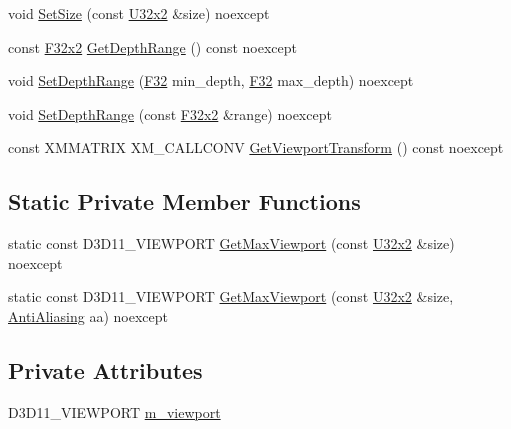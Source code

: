 \begin{DoxyCompactItemize}
\item 
void \mbox{\hyperlink{classmage_1_1rendering_1_1_viewport_a8b5578069d4e4afa99ca4a0b89541025}{Set\+Size}} (const \mbox{\hyperlink{namespacemage_a31f2bb52b5080e706e1c13de07c0a249}{U32x2}} \&size) noexcept
\item 
const \mbox{\hyperlink{namespacemage_a9dc0d34d6ecc87e4cfa4a826102117bc}{F32x2}} \mbox{\hyperlink{classmage_1_1rendering_1_1_viewport_a50cb4c020709eddb8addb4420a59e1d0}{Get\+Depth\+Range}} () const noexcept
\item 
void \mbox{\hyperlink{classmage_1_1rendering_1_1_viewport_a2dc258c833d225567bba28129c061c2d}{Set\+Depth\+Range}} (\mbox{\hyperlink{namespacemage_aa97e833b45f06d60a0a9c4fc22ae02c0}{F32}} min\+\_\+depth, \mbox{\hyperlink{namespacemage_aa97e833b45f06d60a0a9c4fc22ae02c0}{F32}} max\+\_\+depth) noexcept
\item 
void \mbox{\hyperlink{classmage_1_1rendering_1_1_viewport_a99c76e086ab0db6e9311ab4985d760d6}{Set\+Depth\+Range}} (const \mbox{\hyperlink{namespacemage_a9dc0d34d6ecc87e4cfa4a826102117bc}{F32x2}} \&range) noexcept
\item 
const X\+M\+M\+A\+T\+R\+IX X\+M\+\_\+\+C\+A\+L\+L\+C\+O\+NV \mbox{\hyperlink{classmage_1_1rendering_1_1_viewport_ac4ea113f2c019b5b1d369898537ab5c3}{Get\+Viewport\+Transform}} () const noexcept
\end{DoxyCompactItemize}
\subsection*{Static Private Member Functions}
\begin{DoxyCompactItemize}
\item 
static const D3\+D11\+\_\+\+V\+I\+E\+W\+P\+O\+RT \mbox{\hyperlink{classmage_1_1rendering_1_1_viewport_a9a931b51974ac4cd2d93aac2c0e10a09}{Get\+Max\+Viewport}} (const \mbox{\hyperlink{namespacemage_a31f2bb52b5080e706e1c13de07c0a249}{U32x2}} \&size) noexcept
\item 
static const D3\+D11\+\_\+\+V\+I\+E\+W\+P\+O\+RT \mbox{\hyperlink{classmage_1_1rendering_1_1_viewport_ac971d4f062cf37e3a5a2a57640a13da4}{Get\+Max\+Viewport}} (const \mbox{\hyperlink{namespacemage_a31f2bb52b5080e706e1c13de07c0a249}{U32x2}} \&size, \mbox{\hyperlink{namespacemage_1_1rendering_ac3f75e49e92b42f2f5fb55c450d8899c}{Anti\+Aliasing}} aa) noexcept
\end{DoxyCompactItemize}
\subsection*{Private Attributes}
\begin{DoxyCompactItemize}
\item 
D3\+D11\+\_\+\+V\+I\+E\+W\+P\+O\+RT \mbox{\hyperlink{classmage_1_1rendering_1_1_viewport_ab0b20f21a771248d9e9659f1029a497d}{m\+\_\+viewport}}
\end{DoxyCompactItemize}


